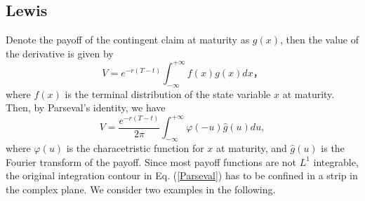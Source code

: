 \documentclass[12pt]{article}
\begin{document}
  \subsection{Lewis \cite{Lewis}}

    Denote the payoff of the contingent claim at maturity as $g(x)$, then the value of the derivative is given by
    \begin{equation}
      V = e^{-r(T-t)}\int_{-\infty}^{+\infty}f(x)g(x)dx，
    \end{equation}
    where $f(x)$ is the terminal distribution of the state variable $x$ at maturity. Then, by Parseval's identity, we have
    \begin{equation}
      V = \frac{e^{-r(T-t)}}{2\pi}\int_{-\infty}^{+\infty}\varphi(-u)\hat{g}(u)du,
      \label{Parseval}
    \end{equation}
    where $\varphi(u)$ is the characetristic function for $x$ at maturity, and $\hat{g}(u)$ is the Fourier transform of
    the payoff. Since most payoff functions are not $L^1$ integrable, the original integration contour in Eq. (\ref{Parseval}) has
    to be confined in a strip in the complex plane. We consider two examples in the following.
\end{document}
